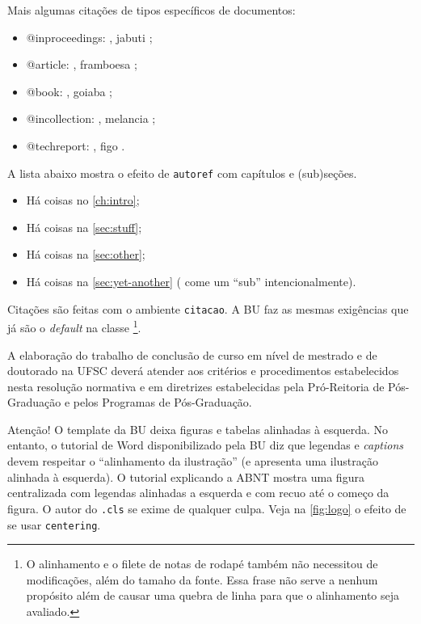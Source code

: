     Mais algumas citações de tipos específicos de documentos:
    \begin{itemize}
    \item @inproceedings: , jabuti
      \cite{Ullman1989magic};
    \item @article: , framboesa \cite{Distefano2019};
    \item @book: , goiaba \cite{Abiteboul1995};
    \item @incollection: , melancia \cite{Forgy1989};
    \item @techreport: , figo \cite{rdf11}.
    \end{itemize}
    
    A lista abaixo mostra o efeito de  \texttt{autoref} com capítulos e (sub)seções.
    
    \begin{itemize}
    \item Há coisas no \autoref{ch:intro};
    \item Há coisas na \autoref{sec:stuff};
    \item Há coisas na \autoref{sec:other};
    \item Há coisas na \autoref{sec:yet-another} (\abnTeX{} come um ``sub'' intencionalmente).
    \end{itemize}
    
    Citações são feitas com o ambiente \texttt{citacao}. A BU faz
    as mesmas exigências que já são o \textit{default} na classe
    \abnTeX\footnote{O alinhamento e o filete de notas de rodapé também
    não necessitou de modificações, além do tamaho da fonte. Essa frase
    não serve a nenhum propósito além de causar uma quebra de linha para
    que o alinhamento seja avaliado.}. 
    
    \begin{citacao}
      A elaboração do trabalho de conclusão de curso em nível de mestrado
      e de doutorado na UFSC deverá atender aos critérios e procedimentos
      estabelecidos nesta resolução normativa e em diretrizes
      estabelecidas pela Pró-Reitoria de Pós-Graduação e pelos Programas
      de Pós-Graduação.
    \end{citacao}
    
    Atenção! O template da BU deixa figuras e tabelas alinhadas à esquerda. No
    entanto, o tutorial de Word disponibilizado pela BU diz que legendas e
    \emph{captions} devem respeitar o ``alinhamento da ilustração'' (e apresenta
    uma ilustração alinhada à esquerda). O tutorial explicando a ABNT mostra uma
    figura centralizada com legendas alinhadas a esquerda e com recuo até o começo
    da figura. O autor do \texttt{.cls} se exime de qualquer culpa. 
    Veja na \autoref{fig:logo} o efeito de se usar \texttt{centering}.
    
